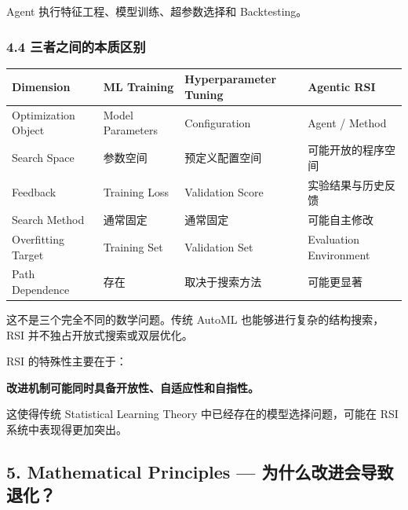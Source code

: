 Agent 执行特征工程、模型训练、超参数选择和 Backtesting。

\hypertarget{part-1-07-0001-ux4e09ux8005ux4e4bux95f4ux7684ux672cux8d28ux533aux522b}{%
\subsubsection{4.4 三者之间的本质区别}\label{part-1-07-0001-ux4e09ux8005ux4e4bux95f4ux7684ux672cux8d28ux533aux522b}}

\begin{readertable}
\begin{longtable}[]{@{}
  >{\raggedright\arraybackslash}p{}
  >{\raggedright\arraybackslash}p{}
  >{\raggedright\arraybackslash}p{}
  >{\raggedright\arraybackslash}p{}@{}}
\toprule
Dimension & ML Training & Hyperparameter Tuning & Agentic RSI \\
\midrule
\endhead
Optimization Object & Model Parameters & Configuration & Agent / Method \\
Search Space & 参数空间 & 预定义配置空间 & 可能开放的程序空间 \\
Feedback & Training Loss & Validation Score & 实验结果与历史反馈 \\
Search Method & 通常固定 & 通常固定 & 可能自主修改 \\
Overfitting Target & Training Set & Validation Set & Evaluation Environment \\
Path Dependence & 存在 & 取决于搜索方法 & 可能更显著 \\
\bottomrule
\end{longtable}
\end{readertable}

这不是三个完全不同的数学问题。传统 AutoML 也能够进行复杂的结构搜索，RSI 并不独占开放式搜索或双层优化。

RSI 的特殊性主要在于：

\textbf{改进机制可能同时具备开放性、自适应性和自指性。}

这使得传统 Statistical Learning Theory 中已经存在的模型选择问题，可能在 RSI 系统中表现得更加突出。

\hypertarget{part-1-07-0001-mathematical-principles-ux4e3aux4ec0ux4e48ux6539ux8fdbux4f1aux5bfcux81f4ux9000ux5316}{%
\subsection{5. Mathematical Principles --- 为什么改进会导致退化？}\label{part-1-07-0001-mathematical-principles-ux4e3aux4ec0ux4e48ux6539ux8fdbux4f1aux5bfcux81f4ux9000ux5316}}

